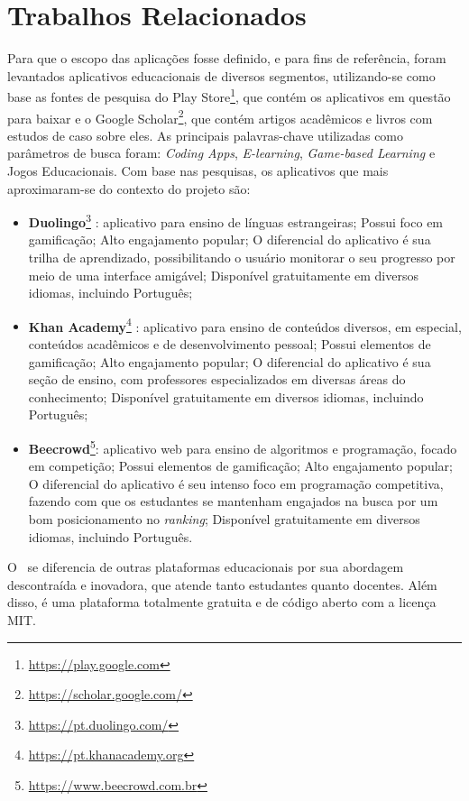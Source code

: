 \section{Trabalhos Relacionados}
Para que o escopo das aplicações fosse definido, e para fins de referência, foram levantados aplicativos educacionais de diversos segmentos, utilizando-se como base as fontes de pesquisa do Play Store\footnote{\url{https://play.google.com}}, que contém os aplicativos em questão para baixar e o Google Scholar\footnote{\url{https://scholar.google.com/}}, que contém artigos acadêmicos e livros com estudos de caso sobre eles. As principais palavras-chave utilizadas como parâmetros de busca foram: \textit{Coding Apps}, \textit{E-learning}, \textit{Game-based Learning} e Jogos Educacionais. Com base nas pesquisas, os aplicativos que mais aproximaram-se do contexto do projeto são:

\begin{itemize}
  \item \textbf{Duolingo}\footnote{\url{https://pt.duolingo.com/}} \cite{duolingo}: aplicativo para ensino de línguas estrangeiras; Possui foco em gamificação; Alto engajamento popular; O diferencial do aplicativo é sua trilha de aprendizado, possibilitando o usuário monitorar o seu progresso por meio de uma interface amigável; Disponível gratuitamente em diversos idiomas, incluindo Português;
  \item \textbf{Khan Academy}\footnote{\url{https://pt.khanacademy.org}} \cite{khan_academy}: aplicativo para ensino de conteúdos diversos, em especial, conteúdos acadêmicos e de desenvolvimento pessoal; Possui elementos de gamificação; Alto engajamento popular; O diferencial do aplicativo é sua seção de ensino, com professores especializados em diversas áreas do conhecimento; Disponível gratuitamente em diversos idiomas, incluindo Português;
  \item \textbf{Beecrowd}\footnote{\url{https://www.beecrowd.com.br}}: aplicativo web para ensino de algoritmos e programação, focado em competição; Possui elementos de gamificação; Alto engajamento popular; O diferencial do aplicativo é seu intenso foco em programação competitiva, fazendo com que os estudantes se mantenham engajados na busca por um bom posicionamento no \textit{ranking}; Disponível gratuitamente em diversos idiomas, incluindo Português.
\end{itemize}

O \appName\ se diferencia de outras plataformas educacionais por sua abordagem descontraída e inovadora, que atende tanto estudantes quanto docentes. Além disso, é uma plataforma totalmente gratuita e de código aberto com a licença MIT.
